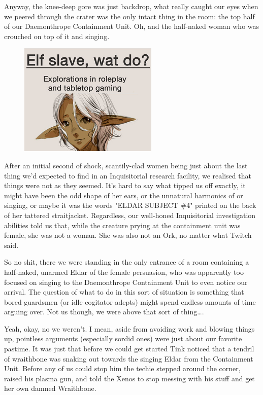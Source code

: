 Anyway, the knee-deep gore was just backdrop, what really caught our eyes when we peered through the crater was the only intact thing in the room: 
the top half of our Daemonthrope Containment Unit. 
Oh, and the half-naked woman who was crouched on top of it and singing.

\begin{figure}
	\begin{center}
		\includegraphics[width=\figwidth]{pics/16/26.png}
	\end{center}
\end{figure}
After an initial second of shock, scantily-clad women being just about the last thing we'd expected to find in an Inquisitorial research facility, we realised that things were not as they seemed. 
It's hard to say what tipped us off exactly, it might have been the odd shape of her ears, or the unnatural harmonics of or singing, or maybe it was the words "ELDAR SUBJECT \#4" printed on the back of her tattered straitjacket. 
Regardless, our well-honed Inquisitorial investigation abilities told us that, while the creature prying at the containment unit was female, she was not a woman. 
She was also not an Ork, no matter what Twitch said.

So no shit, there we were standing in the only entrance of a room containing a half-naked, unarmed Eldar of the female persuasion, who was apparently too focused on singing to the Daemonthrope Containment Unit to even notice our arrival. 
The question of what to do in this sort of situation is something that bored guardsmen (or idle cogitator adepts) might spend endless amounts of time arguing over. 
Not us though, we were above that sort of thing…. 


Yeah, okay, no we weren't. 
I mean, aside from avoiding work and blowing things up, pointless arguments (especially sordid ones) were just about our favorite pastime. 
It was just that before we could get started Tink noticed that a tendril of wraithbone was snaking out towards the singing Eldar from the Containment Unit. 
Before any of us could stop him the techie stepped around the corner, raised his plasma gun, and told the Xenos to stop messing with his stuff and get her own damned Wraithbone.

